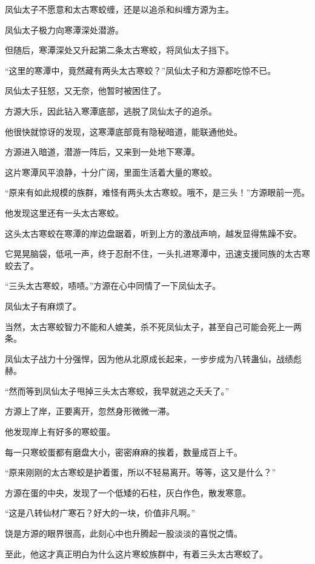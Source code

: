 
\begin{this_body}

凤仙太子不愿意和太古寒蛟缠，还是以追杀和纠缠方源为主。

凤仙太子极力向寒潭深处潜游。

但随后，寒潭深处又升起第二条太古寒蛟，将凤仙太子挡下。

“这里的寒潭中，竟然藏有两头太古寒蛟？”凤仙太子和方源都吃惊不已。

凤仙太子狂怒，又无奈，他暂时被困住了。

方源大乐，因此钻入寒潭底部，逃脱了凤仙太子的追杀。

他很快就惊讶的发现，这寒潭底部竟有隐秘暗道，能联通他处。

方源进入暗道，潜游一阵后，又来到一处地下寒潭。

这片寒潭风平浪静，十分广阔，里面生活着大量的寒蛟。

“原来有如此规模的族群，难怪有两头太古寒蛟。哦不，是三头！”方源眼前一亮。

他发现这里还有一头太古寒蛟。

这头太古寒蛟在寒潭的岸边盘踞着，听到上方的激战声响，越发显得焦躁不安。

它晃晃脑袋，低吼一声，终于忍耐不住，一头扎进寒潭中，迅速支援同族的太古寒蛟去了。

“三头太古寒蛟，啧啧。”方源在心中同情了一下凤仙太子。

凤仙太子有麻烦了。

当然，太古寒蛟智力不能和人媲美，杀不死凤仙太子，甚至自己可能会死上一两条。

凤仙太子战力十分强悍，因为他从北原成长起来，一步步成为八转蛊仙，战绩彪赫。

“然而等到凤仙太子甩掉三头太古寒蛟，我早就逃之夭夭了。”

方源上了岸，正要离开，忽然身形微微一滞。

他发现岸上有好多的寒蛟蛋。

每一只寒蛟蛋都有磨盘大小，密密麻麻的挨着，数量成百上千。

“原来刚刚的太古寒蛟是护着蛋，所以不轻易离开。等等，这又是什么？”

方源在蛋的中央，发现了一个低矮的石柱，灰白作色，散发寒意。

“这是八转仙材广寒石？好大的一块，价值非凡啊。”

饶是方源的眼界很高，此刻心中也升腾起一股淡淡的喜悦之情。

至此，他这才真正明白为什么这片寒蛟族群中，有着三头太古寒蛟了。


\end{this_body}
